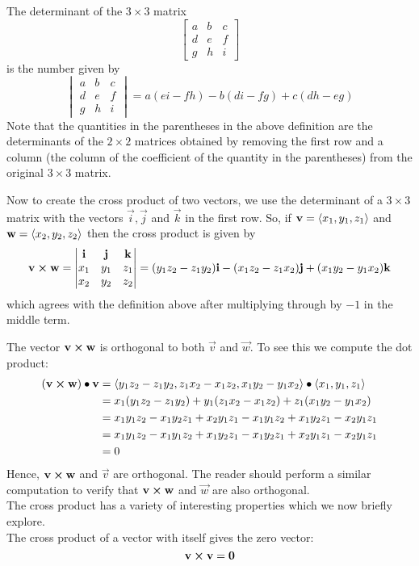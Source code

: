 \documentclass[handout]{ximera}
\begin{document}
\begin{definition}
The determinant of the $3 \times 3$ matrix 
\[
\begin{bmatrix}
a & b & c\\
d & e & f\\
g & h & i
\end{bmatrix}
\]
is the number given by
\[
\begin{vmatrix}
a & b & c\\
d & e & f\\
g & h & i
\end{vmatrix}
= a(ei-fh) - b(di-fg) + c(dh-eg)
\]
Note that the quantities in the parentheses in the above definition are the determinants of the $2 \times 2$ matrices
obtained by removing the first row and a column (the column of the coefficient of the quantity in the parentheses) from the original $3 \times 3$ matrix.
\end{definition}
 Now to create the cross product of two vectors, we use the determinant of a $3 \times 3$ matrix with the vectors $\vec{i}, \vec{j}$ and $\vec{k}$ in the first row.
 So, if $\mathbf{v} = \left\langle x_1, y_1, z_1\right\rangle$ and $\mathbf{w} = \left\langle x_2, y_2, z_2\right\rangle$ then the cross product is given by
 \[
\mathbf{v} \boldsymbol\times \mathbf{w} = 
 \begin{vmatrix}
\mathbf{i} & \mathbf{j} & \mathbf{k}\\
x_1 & y_1 & z_1\\
x_2 & y_2 & z_2
\end{vmatrix} = (y_1z_2 - z_1y_2)\mathbf{i} - (x_1z_2 - z_1x_2)\mathbf{j} + (x_1y_2-y_1x_2)\mathbf{k}
\]
which agrees with the definition above after multiplying through by $-1$ in the middle term.

The vector $\mathbf{v}\boldsymbol\times \mathbf{w}$ is orthogonal to both $\vec{v}$ and $\vec{w}$. To see this we compute the dot product:
\begin{align*}
\left(\mathbf{v} \boldsymbol\times \mathbf{w} \right) \bullet \mathbf{v} &= \left\langle y_1z_2 - z_1y_2, z_1x_2 - x_1z_2, x_1y_2 - y_1x_2\right\rangle \bullet \left\langle x_1, y_1, z_1\right\rangle\\
                                                &= x_1(y_1z_2 - z_1y_2) + y_1(z_1x_2 - x_1z_2) + z_1(x_1y_2 - y_1x_2)\\
                                                &= x_1y_1z_2 - x_1y_2z_1 + x_2y_1z_1 - x_1y_1z_2 + x_1y_2z_1 - x_2y_1z_1\\
                                                &= x_1y_1z_2 - x_1y_1z_2 + x_1y_2z_1 - x_1y_2z_1 + x_2y_1z_1 - x_2y_1z_1\\
                                                &= 0
\end{align*}
Hence, $\mathbf{v} \boldsymbol\times \mathbf{w}$ and $\vec{v}$ are orthogonal.  The reader should perform a similar computation to verify that
$\mathbf{v} \boldsymbol\times \mathbf{w}$ and $\vec{w}$ are also orthogonal.\\
The cross product has a variety of interesting properties which we now briefly explore.\\
The cross product of a vector with itself gives the zero vector:
\[
\mathbf{v} \boldsymbol\times \mathbf{v} = \mathbf{0}
\]
\end{document}
